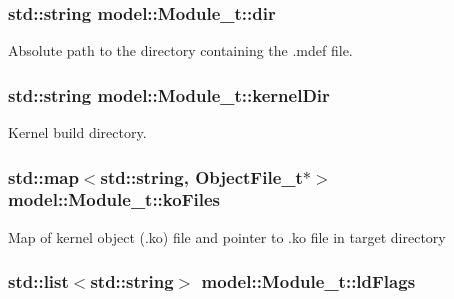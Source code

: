 \subsubsection[{\texorpdfstring{dir}{dir}}]{\setlength{\rightskip}{0pt plus 5cm}std\+::string model\+::\+Module\+\_\+t\+::dir}\hypertarget{structmodel_1_1_module__t_a60d1007e706a0db0c3c33313e4e533ae}{}\label{structmodel_1_1_module__t_a60d1007e706a0db0c3c33313e4e533ae}


Absolute path to the directory containing the .mdef file. 

\subsubsection[{\texorpdfstring{kernel\+Dir}{kernelDir}}]{\setlength{\rightskip}{0pt plus 5cm}std\+::string model\+::\+Module\+\_\+t\+::kernel\+Dir}\hypertarget{structmodel_1_1_module__t_a7dd34ecea15348c8a9f47a6e4e23d81b}{}\label{structmodel_1_1_module__t_a7dd34ecea15348c8a9f47a6e4e23d81b}


Kernel build directory. 

\subsubsection[{\texorpdfstring{ko\+Files}{koFiles}}]{\setlength{\rightskip}{0pt plus 5cm}std\+::map$<$std\+::string, {\bf Object\+File\+\_\+t}$\ast$$>$ model\+::\+Module\+\_\+t\+::ko\+Files}\hypertarget{structmodel_1_1_module__t_a9d79292110b6c30ef2c0a55e932f862c}{}\label{structmodel_1_1_module__t_a9d79292110b6c30ef2c0a55e932f862c}
Map of kernel object (.ko) file and pointer to .ko file in target directory 
\subsubsection[{\texorpdfstring{ld\+Flags}{ldFlags}}]{\setlength{\rightskip}{0pt plus 5cm}std\+::list$<$std\+::string$>$ model\+::\+Module\+\_\+t\+::ld\+Flags}\hypertarget{structmodel_1_1_module__t_aa926d875c7b91249fd3626cece0f663c}{}\label{structmodel_1_1_module__t_aa926d875c7b91249fd3626cece0f663c}


